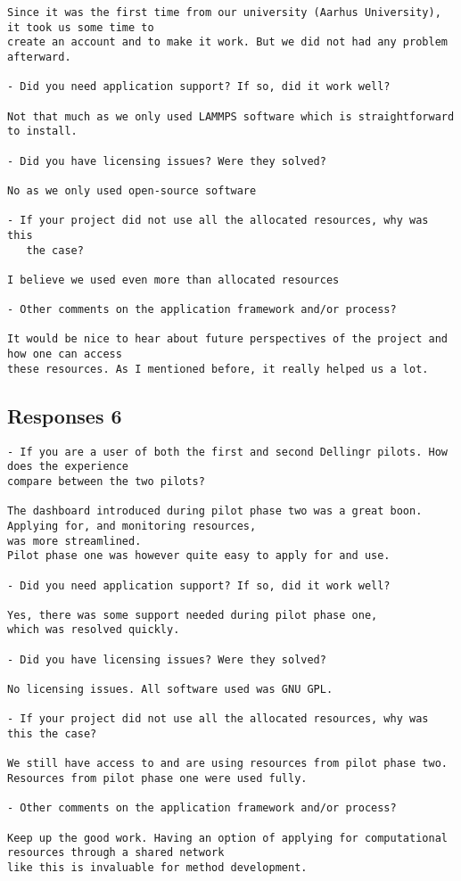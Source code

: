 {\begin{verbatim}
Since it was the first time from our university (Aarhus University), it took us some time to
create an account and to make it work. But we did not had any problem afterward.

- Did you need application support? If so, did it work well?

Not that much as we only used LAMMPS software which is straightforward to install. 

- Did you have licensing issues? Were they solved?

No as we only used open-source software

- If your project did not use all the allocated resources, why was this
   the case?

I believe we used even more than allocated resources

- Other comments on the application framework and/or process?

It would be nice to hear about future perspectives of the project and how one can access 
these resources. As I mentioned before, it really helped us a lot.
\end{verbatim}

\subsection*{Responses 6}
\begin{verbatim}
- If you are a user of both the first and second Dellingr pilots. How does the experience 
compare between the two pilots?

The dashboard introduced during pilot phase two was a great boon. Applying for, and monitoring resources, 
was more streamlined.
Pilot phase one was however quite easy to apply for and use.

- Did you need application support? If so, did it work well?

Yes, there was some support needed during pilot phase one,
which was resolved quickly.

- Did you have licensing issues? Were they solved?

No licensing issues. All software used was GNU GPL.

- If your project did not use all the allocated resources, why was this the case?

We still have access to and are using resources from pilot phase two.
Resources from pilot phase one were used fully.

- Other comments on the application framework and/or process?

Keep up the good work. Having an option of applying for computational resources through a shared network 
like this is invaluable for method development.
\end{verbatim}
}
